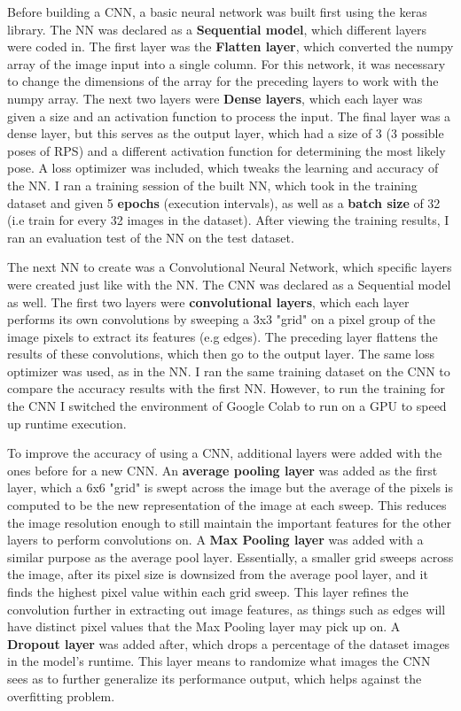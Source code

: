 \documentclass[10pt,twocolumn]{article}
\begin{document}
Before building a CNN, a basic neural network was built first using the keras library. The NN was declared as a \textbf{Sequential model}, which different layers were coded in. The first layer was the \textbf{Flatten layer}, which converted the numpy array of the image input into a single column. For this network, it was necessary to change the dimensions of the array for the preceding layers to work with the numpy array. The next two layers were \textbf{Dense layers}, which each layer was given a size and an activation function to process the input. The final layer was a dense layer, but this serves as the output layer, which had a size of 3 (3 possible poses of RPS) and a different activation function for determining the most likely pose. A loss optimizer was included, which tweaks the learning and accuracy of the NN. I ran a training session of the built NN, which took in the training dataset and given 5 \textbf{epochs} (execution intervals), as well as a \textbf{batch size} of 32 (i.e train for every 32 images in the dataset). After viewing the training results, I ran an evaluation test of the NN on the test dataset.

The next NN to create was a Convolutional Neural Network, which specific layers were created just like with the NN. The CNN was declared as a Sequential model as well. The first two layers were \textbf{convolutional layers}, which each layer performs its own convolutions by sweeping a 3x3 "grid" on a pixel group of the image pixels to extract its features (e.g edges). The preceding layer flattens the results of these convolutions, which then go to the output layer. The same loss optimizer was used, as in the NN. I ran the same training dataset on the CNN to compare the accuracy results with the first NN. However, to run the training for the CNN I switched the environment of Google Colab to run on a GPU to speed up runtime execution.

To improve the accuracy of using a CNN, additional layers were added with the ones before for a new CNN. An \textbf{average pooling layer} was added as the first layer, which a 6x6 "grid" is swept across the image but the average of the pixels is computed to be the new representation of the image at each sweep. This reduces the image resolution enough to still maintain the important features for the other layers to perform convolutions on. A \textbf{Max Pooling layer} was added with a similar purpose as the average pool layer. Essentially, a smaller grid sweeps across the image, after its pixel size is downsized from the average pool layer, and it finds the highest pixel value within each grid sweep. This layer refines the convolution further in extracting out image features, as things such as edges will have distinct pixel values that the Max Pooling layer may pick up on. A \textbf{Dropout layer} was added after, which drops a percentage of the dataset images in the model's runtime. This layer means to randomize what images the CNN sees as to further generalize its performance output, which helps against the overfitting problem.
\end{document}
